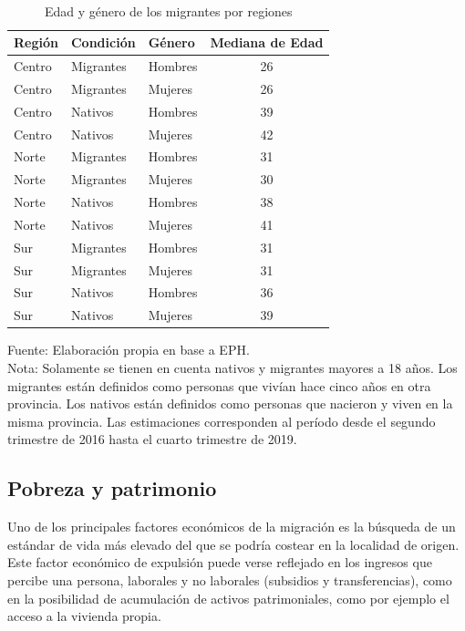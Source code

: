 \documentclass[12pt,a4paper]{article}
\begin{document}
\begin{table}[htbp!]
\caption{\\Edad y género de los migrantes por regiones} 
\centering
\footnotesize
\begin{tabular}{lllc}
  \hline
  \hline
Región & Condición & Género & Mediana de Edad \\ 
  \hline
  \hline
 Centro & Migrantes & Hombres & 26 \\ 
 Centro & Migrantes & Mujeres & 26 \\ 
 Centro & Nativos & Hombres & 39 \\ 
 Centro & Nativos & Mujeres & 42 \\ 
 Norte & Migrantes & Hombres & 31\\ 
 Norte & Migrantes & Mujeres & 30 \\ 
 Norte & Nativos & Hombres & 38 \\ 
 Norte & Nativos & Mujeres & 41 \\ 
 Sur & Migrantes & Hombres & 31 \\ 
 Sur & Migrantes & Mujeres & 31 \\ 
 Sur & Nativos & Hombres & 36\\ 
 Sur & Nativos & Mujeres & 39 \\ 
   \hline
\end{tabular}
\label{cuadro:edad_mig}
\begin{flushleft}
\begin{scriptsize}
Fuente: Elaboración propia en base a EPH.\\
Nota: Solamente se tienen en cuenta nativos y migrantes mayores a 18 años. Los migrantes están definidos como personas que vivían hace cinco años en otra provincia. Los nativos están definidos como personas que nacieron y viven en la misma provincia. Las estimaciones corresponden al período desde el segundo trimestre de 2016 hasta el cuarto trimestre de 2019.\\
\end{scriptsize}
\end{flushleft}
\end{table}


\newpage
\subsection{Pobreza y patrimonio}

Uno de los principales factores económicos de la migración es la búsqueda de un estándar de vida más elevado del que se podría costear en la localidad de origen. Este factor económico de expulsión puede verse reflejado en los ingresos que percibe una persona, laborales y no laborales (subsidios y transferencias), como en la posibilidad de acumulación de activos patrimoniales, como por ejemplo el acceso a la vivienda propia.
\end{document}
